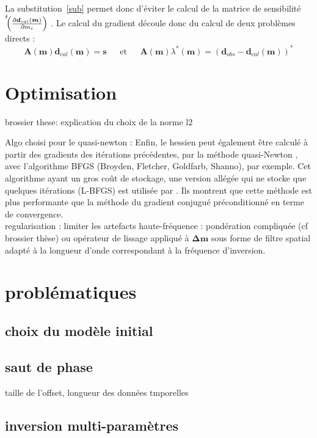 La substitution~\ref{sub} permet donc d'éviter le calcul de la matrice de sensibilité $\tr{\left( \frac{\dd \bm{d}_{cal}(\bm{m}) }{\dd m_{i}} \right)}$ . Le calcul du gradient découle donc du calcul de deux problèmes directs : 
\begin{equation*}
	\bm{A}(\bm{m})\bm{d}_{cal}(\bm{m})=\bm{s} ~~~~~~~\text{et}~~~~~~~\bm{A}(\bm{m}) \lambda^*(\bm{m})=( \bm{d}_{obs} - \bm{d}_{cal}(\bm{m}))^*
\end{equation*}




\section{Optimisation}

brossier these: explication du choix de la norme l2

Algo choisi pour le quasi-newton : Enfin, le hessien peut également être calculé à partir des gradients des itérations précédentes, par la méthode quasi-Newton \citep{nocedal}, avec l'algorithme BFGS (Broyden, Fletcher, Goldfarb, Shanno), par exemple. Cet algorithme ayant un gros coût de stockage, une version allégée qui ne stocke que quelques itérations (L-BFGS) est utilisée par \cite{brossier_2009}. Ils montrent que cette méthode est plus performante que la méthode du gradient conjugué préconditionné en terme de convergence. \\

regularisation : limiter les artefacts haute-fréquence : pondération compliquée (cf brossier thèse) ou opérateur de lissage appliqué à $\bm{\Delta m}$ sous forme de filtre spatial adapté à la longueur d'onde correspondant à la fréquence d'inversion.



\section{problématiques}

\subsection{choix du modèle initial}
\subsection{saut de phase}
taille de l'offset, longueur des données tmporelles
\subsection{inversion multi-paramètres}
